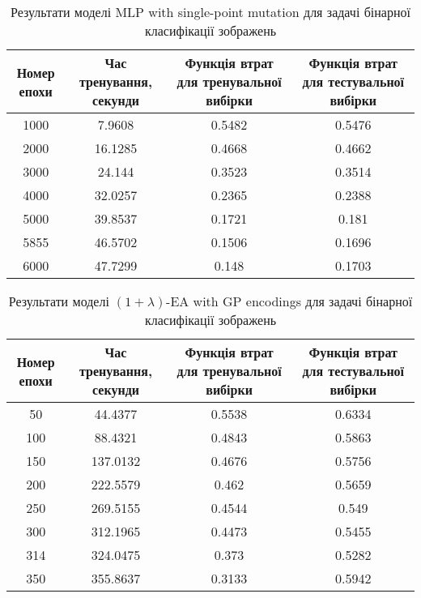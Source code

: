 \begin{table}[ht]
	\centering
	\begin{adjustbox}{max width=\textwidth}
		\begin{tabular}{|c|c|c|c|}
			\hline 
			Номер епохи & Час тренування, секунди & Функція втрат для тренувальної вибірки & Функція втрат для тестувальної вибірки \\
			\hline 
			1000 & 7.9608 & 0.5482 & 0.5476 \\
			\hline 
			2000 & 16.1285 & 0.4668 & 0.4662 \\
			\hline
			3000 & 24.144 & 0.3523 & 0.3514 \\
			\hline
			4000 & 32.0257 & 0.2365 & 0.2388 \\
			\hline
			5000 & 39.8537 & 0.1721 & 0.181 \\
			\hline
			5855 & 46.5702 & 0.1506 & 0.1696 \\
			\hline
			6000 & 47.7299 & 0.148 & 0.1703 \\
			\hline
		\end{tabular}
	\end{adjustbox}
	\caption{Результати моделі MLP with single-point mutation для задачі бінарної класифікації зображень}
	\label{mlp_spm_bc_id_results}
\end{table}

\begin{table}[ht]
	\centering
	\begin{adjustbox}{max width=\textwidth}
		\begin{tabular}{|c|c|c|c|}
			\hline 
			Номер епохи & Час тренування, секунди & Функція втрат для тренувальної вибірки & Функція втрат для тестувальної вибірки \\
			\hline 
			50 & 44.4377 & 0.5538 & 0.6334 \\
			\hline 
			100 & 88.4321 & 0.4843 & 0.5863 \\
			\hline
			150 & 137.0132 & 0.4676 & 0.5756 \\
			\hline
			200 & 222.5579 & 0.462 & 0.5659 \\
			\hline
			250 & 269.5155 & 0.4544 & 0.549 \\
			\hline
			300 & 312.1965 & 0.4473 & 0.5455 \\
			\hline
			314 & 324.0475 & 0.373 & 0.5282 \\
			\hline
			350 & 355.8637 & 0.3133 & 0.5942 \\
			\hline
		\end{tabular}
	\end{adjustbox}
	\caption{Результати моделі $(1+\lambda)$-EA with GP encodings для задачі бінарної класифікації зображень}
	\label{ea_bc_id_results}
\end{table}


